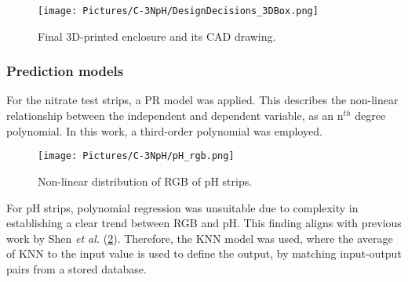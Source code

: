 \begin{figure}[H]
	\centering
	\texttt{[image: Pictures/C-3NpH/DesignDecisions\_3DBox.png]}
	\captionsetup{justification = centering}
	\caption{Final 3D-printed enclosure and its CAD drawing.}
	\label{fig:3Dbox}
\end{figure}

\clearpage
\subsubsection{Prediction models}
For the nitrate test strips, a \gls{PR} model was applied. This describes the non-linear relationship between the independent and dependent variable, as an n$^{th}$ degree polynomial. In this work, a third-order polynomial was employed. 

\begin{figure}[h!]
	\centering 
	\texttt{[image: Pictures/C-3NpH/pH\_rgb.png]}
	\captionsetup{justification = centering}
	\caption{Non-linear distribution of RGB of pH strips.\cite{Shen2012}}
	\label{fig:pHvar}
\end{figure}

For pH strips, polynomial regression was unsuitable due to complexity in establishing a clear trend between RGB and pH. This finding aligns with previous work by Shen \textit{et al.} \cite{Shen2012} (\cref{fig:pHvar}). Therefore, the \gls{KNN} model was used, where the average of \gls{KNN} to the input value is used to define the output, by matching input-output pairs from a stored database. %

